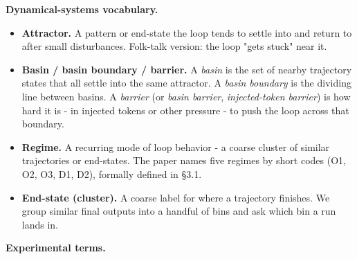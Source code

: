 \documentclass{article}
\theoremstyle{plain}
\theoremstyle{definition}
\begin{document}
\textbf{Dynamical-systems vocabulary.}

\begin{itemize}
  \item \textbf{Attractor.} A pattern or end-state the loop tends to settle
  into and return to after small disturbances. Folk-talk version:
  the loop "gets stuck" near it.
  \item \textbf{Basin / basin boundary / barrier.} A \textit{basin} is the set of
  nearby trajectory states that all settle into the same attractor.
  A \textit{basin boundary} is the dividing line between basins. A
  \textit{barrier} (or \textit{basin barrier}, \textit{injected-token barrier}) is how
  hard it is - in injected tokens or other pressure - to push the
  loop across that boundary.
  \item \textbf{Regime.} A recurring mode of loop behavior - a coarse cluster
  of similar trajectories or end-states. The paper names five regimes
  by short codes (O1, O2, O3, D1, D2), formally defined in §3.1.
  \item \textbf{End-state (cluster).} A coarse label for where a trajectory
  finishes. We group similar final outputs into a handful of bins
  and ask which bin a run lands in.
\end{itemize}

\textbf{Experimental terms.}
\end{document}
